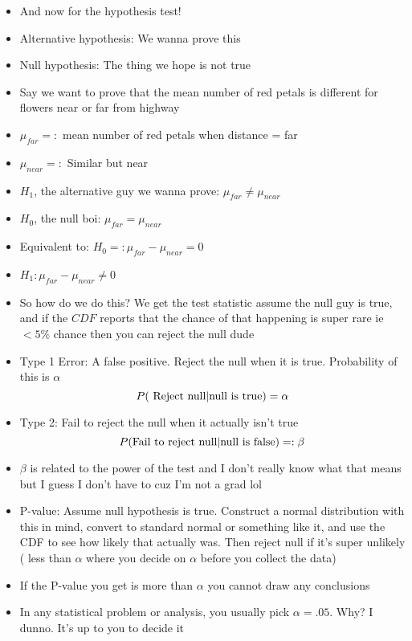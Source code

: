 \documentclass{article}
\begin{document}
\begin{itemize}
      \item And now for the hypothesis test!
      \item Alternative hypothesis: We wanna prove this
      \item Null hypothesis: The thing we hope is not true
      \item Say we want to prove that the mean number of red petals is different for flowers near or far from highway
      \item $ \mu_{far} =: $ mean number of red petals when distance = far
      \item  $ \mu_{near} =: $ Similar but near
      \item  $ H_1 $, the alternative guy we wanna prove:  $ \mu_{far} \neq \mu_{near} $
      \item $ H_0 $, the null boi:  $ \mu_{far} = \mu_{near} $
      \item Equivalent to:  $ H_0 =: \mu_{far} - \mu_{near} = 0  $
      \item  $ H_1:  \mu_{far} - \mu_{near} \neq 0 $
      \item So how do we do this? We get the test statistic assume the null guy is true, and if the $ CDF $ reports that the chance of that happening is super rare  ie $ < 5\% $ chance then you can reject the null dude
      \item Type 1 Error: A false positive. Reject the null when it is true. Probability of this is  $ \alpha $
         \[
         P( \textnormal{ Reject null} | \textnormal{null is true}) = \alpha
         \] 
       \item Type 2: Fail to reject the null  when it actually isn't true
         \[
           P( \textnormal{Fail to reject null} | \textnormal{null is false}) =: \beta
         \] 
       \item $ \beta $ is related to the power of the test and I don't really know what that means but I guess I don't have to cuz I'm not a grad lol
       \item P-value: Assume null hypothesis is true. Construct a normal distribution with this in mind, convert to standard normal or something like it, and use the CDF to see how likely that actually was. Then reject null if it's super unlikely ( less than $ \alpha $ where you decide on  $ \alpha $ before you collect the data)
       \item If the P-value you get is more than  $ \alpha $ you cannot draw any conclusions
       \item In any statistical problem or analysis, you usually pick  $ \alpha = .05$. Why? I dunno. It's up to you to decide it

\end{itemize}
\end{document}
